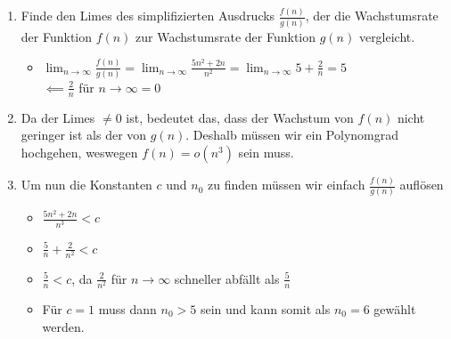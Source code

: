 \documentclass[
../AuD-Zusammenfassung.tex,
]
{subfiles}
\begin{document}
\begin{enumerate}
    \item Finde den Limes des simplifizierten Ausdrucks $\frac{f(n)}{g(n)}$, der die Wachstumsrate der Funktion $f(n)$ zur Wachstumsrate der Funktion $g(n)$ vergleicht.
    \begin{itemize}
        \item $\lim_{n \to \infty} \frac{f(n)}{g(n)} = \lim_{n \to \infty} \frac{5n^2 + 2n}{n^2} = \lim_{n \to \infty} 5 + \frac{2}{n} = 5$\\
        $\impliedby \frac{2}{n}$ für $n \to \infty = 0$ 
    \end{itemize}
    \item Da der Limes $\not= 0$ ist, bedeutet das, dass der Wachstum von $f(n)$ nicht geringer ist als der von $g(n)$. Deshalb müssen wir ein Polynomgrad hochgehen, weswegen $f(n) = o(n^3)$ sein muss. 
    \item Um nun die Konstanten $c$ und $n_0$ zu finden müssen wir einfach $\frac{f(n)}{g(n)}$ auflösen
    \begin{itemize}
        \item $\frac{5n^2 + 2n}{n^3} < c$
        \item $\frac{5}{n} + \frac{2}{n^2} < c$
        \item $\frac{5}{n} < c$, da $\frac{2}{n^2}$ für $n \to \infty$ schneller abfällt als $\frac{5}{n}$
        \item Für $c = 1$ muss dann $n_0 > 5$ sein und kann somit als $n_0 = 6$ gewählt werden.
    \end{itemize}
\end{enumerate}
\end{document}
